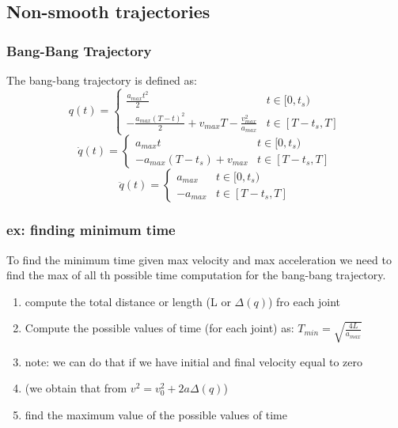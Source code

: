 \documentclass[a4paper,12pt]{article}
\begin{document}
\subsection{Non-smooth trajectories}
\subsubsection{Bang-Bang Trajectory}
The bang-bang trajectory is defined as:
\begin{equation}
    q(t) = \begin{cases}
        \frac{a_{max}t^2}{2} & t \in [0,t_s)\\
        -\frac{a_{max}(T-t)^2}{2}+v_{max}T -\frac{v^2_{max}}{a_{max}} & t \in [T-t_s,T]
    \end{cases}
\end{equation}
\begin{equation}
    \dot{q}(t) = \begin{cases}
        a_{max}t & t \in [0,t_s)\\
        -a_{max}(T-t_s)+v_{max} & t \in [T-t_s,T]
    \end{cases}
\end{equation}
\begin{equation}
    \ddot{q}(t) = \begin{cases}
        a_{max} & t \in [0,t_s)\\
        -a_{max} & t \in [T-t_s,T]
    \end{cases}
\end{equation}
\subsubsection{ex: finding minimum time}
To find the minimum time given max velocity and max acceleration we need to find the max
of all th possible time computation for the bang-bang trajectory.
\begin{enumerate}
    \item compute the total distance or length (L or $\Delta(q)$) fro each joint
    \item Compute the possible values of time (for each joint) as:
            $T_{min} = \sqrt{\frac{4L}{a_{max}}}$
    \item note: we can do that if we have initial and final velocity equal to zero
    \item (we obtain that from $v^2=v^2_0+2a\Delta(q)$)
    \item find the maximum value of the possible values of time
\end{enumerate}
\end{document}
